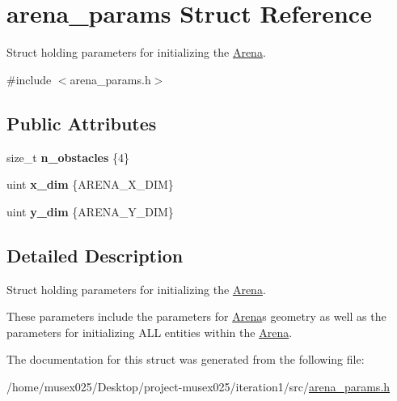 \hypertarget{structarena__params}{}\section{arena\+\_\+params Struct Reference}
\label{structarena__params}


Struct holding parameters for initializing the \hyperlink{classArena}{Arena}.  




{\ttfamily \#include $<$arena\+\_\+params.\+h$>$}

\subsection*{Public Attributes}
\begin{DoxyCompactItemize}
\item 
size\+\_\+t {\bfseries n\+\_\+obstacles} \{4\}\hypertarget{structarena__params_a41015e200424ec7ef1f86eaf0ce99dd0}{}\label{structarena__params_a41015e200424ec7ef1f86eaf0ce99dd0}

\item 
uint {\bfseries x\+\_\+dim} \{A\+R\+E\+N\+A\+\_\+\+X\+\_\+\+D\+IM\}\hypertarget{structarena__params_afa86b434ed8ea5a4fe9ae14ae1438e8f}{}\label{structarena__params_afa86b434ed8ea5a4fe9ae14ae1438e8f}

\item 
uint {\bfseries y\+\_\+dim} \{A\+R\+E\+N\+A\+\_\+\+Y\+\_\+\+D\+IM\}\hypertarget{structarena__params_ab5d50b9affa9c753c15e1d6f088824af}{}\label{structarena__params_ab5d50b9affa9c753c15e1d6f088824af}

\end{DoxyCompactItemize}


\subsection{Detailed Description}
Struct holding parameters for initializing the \hyperlink{classArena}{Arena}. 

These parameters include the parameters for \hyperlink{classArena}{Arena}\textquotesingle{}s geometry as well as the parameters for initializing A\+LL entities within the \hyperlink{classArena}{Arena}. 

The documentation for this struct was generated from the following file\+:\begin{DoxyCompactItemize}
\item 
/home/musex025/\+Desktop/project-\/musex025/iteration1/src/\hyperlink{arena__params_8h}{arena\+\_\+params.\+h}\end{DoxyCompactItemize}
